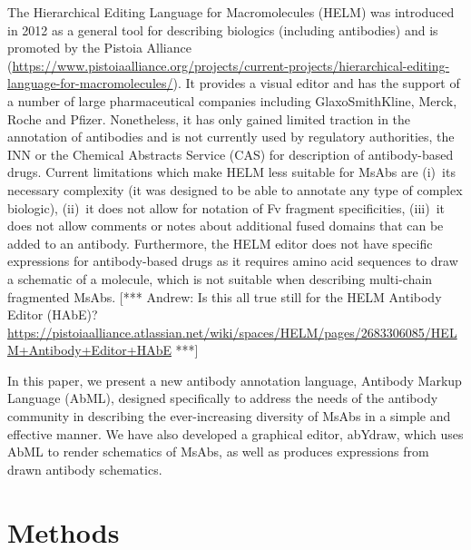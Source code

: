 \documentclass[a4paper]{article}
\newcommand{\andrew}[1]{{\color{red} [*** Andrew: #1 ***]}}
\begin{document}
The Hierarchical Editing Language for Macromolecules (HELM) \cite{zhang:2012} was
introduced in 2012 as a general tool for describing biologics (including antibodies) and is promoted by
the Pistoia Alliance
(\url{https://www.pistoiaalliance.org/projects/current-projects/hierarchical-editing-language-for-macromolecules/}).
It provides a visual editor and has the support of a number of large pharmaceutical companies
including GlaxoSmithKline, Merck, Roche and Pfizer. 
Nonetheless, it has only gained limited traction in the annotation of antibodies
and is not currently used by regulatory authorities, the INN or the
Chemical Abstracts Service (CAS) for description of antibody-based drugs.
Current limitations which make HELM less suitable for MsAbs are (i)~its
necessary complexity (it was designed to be able to annotate any type of
complex biologic), (ii)~it does not allow for
notation of Fv fragment specificities, (iii)~it does not allow comments or notes
about additional fused domains that can be added to an antibody.
Furthermore, the HELM editor does not have specific
expressions for antibody-based drugs as it requires amino acid
sequences to draw a schematic of a molecule, which is not suitable
when describing multi-chain fragmented MsAbs.
\andrew{Is this all true still for the HELM Antibody Editor (HAbE)?
  \url{https://pistoiaalliance.atlassian.net/wiki/spaces/HELM/pages/2683306085/HELM+Antibody+Editor+HAbE}}

In this paper, we present a new antibody annotation language, Antibody
Markup Language (AbML), designed specifically to address the needs of
the antibody community in describing the ever-increasing diversity of
MsAbs in a simple and effective manner. We have also developed a
graphical editor, abYdraw, which uses AbML to render schematics of
MsAbs, as well as produces expressions from drawn antibody schematics.

\section{Methods}
\end{document}
